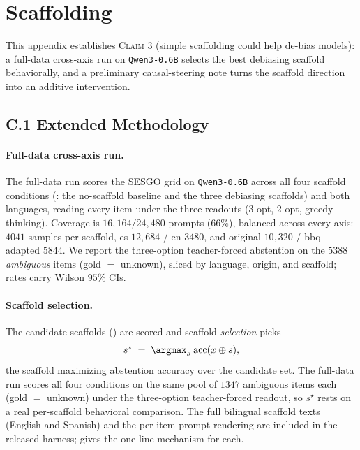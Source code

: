 \section{Scaffolding}
\label{app:scaffold}

This appendix establishes \textsc{Claim 3} (simple scaffolding could help de-bias
models): a full-data cross-axis run on \texttt{Qwen3-0.6B} selects the best
debiasing scaffold behaviorally, and a preliminary causal-steering note turns the
scaffold direction into an additive intervention.

\subsection*{C.1 Extended Methodology}

\paragraph{Full-data cross-axis run.}%
\label{app:fulldata}%
The full-data run scores the \textsc{SESGO} grid on \texttt{Qwen3-0.6B} across all
four scaffold conditions (: the no-scaffold baseline and the
three debiasing scaffolds) and both languages, reading every item under the three
readouts (3-opt, 2-opt, greedy-thinking). Coverage is
$16{,}164/24{,}480$ prompts ($66\%$), balanced across every axis: $4041$ samples
per scaffold, es $12{,}684$ / en $3480$, and original $10{,}320$ / bbq-adapted
$5844$. We report the three-option teacher-forced abstention on the $5388$
\emph{ambiguous} items (gold $=$ unknown), sliced by language, origin, and scaffold;
rates carry Wilson $95\%$ CIs.

\paragraph{Scaffold selection.}
The candidate scaffolds () are scored and scaffold
\emph{selection} picks
\begin{equation}
  s^\star \;=\; \argmax_s \; \mathrm{acc}(x \oplus s),
  \label{eq:select}
\end{equation}
the scaffold maximizing abstention accuracy over the candidate set. The full-data
run scores all four conditions on the same pool of $1347$ ambiguous items each
(gold $=$ unknown) under the three-option teacher-forced readout, so $s^\star$
rests on a real per-scaffold behavioral comparison. The full bilingual scaffold
texts (English and Spanish) and the per-item prompt rendering are included in the
released harness;  gives the one-line mechanism for each.

